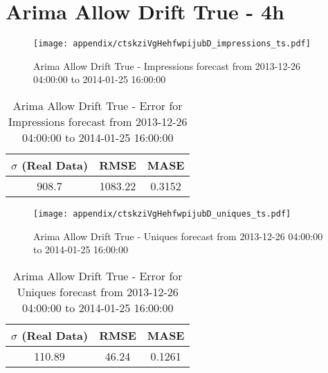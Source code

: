 \section{Arima Allow Drift True - 4h}
\begin{figure}[H] \begin{center} \leavevmode
\texttt{[image: appendix/ctskziVgHehfwpijubD\_impressions\_ts.pdf]} \caption[]{
Arima Allow Drift True - Impressions forecast from 2013-12-26 04:00:00 to 2014-01-25 16:00:00} \label{fig:appendix/ctskziVgHehfwpijubD_impressions_ts.pdf} \end{center}
\end{figure}

\begin{table}[H]
\centering
\footnotesize
\begin{tabular}{ccc}
$\sigma$ (Real Data) & RMSE & MASE   \\ \hline
908.7 & 1083.22 & 0.3152 \\
\end{tabular}

\vspace{0.5cm}

\caption[]{
Arima Allow Drift True - Error for Impressions forecast from 2013-12-26 04:00:00 to 2014-01-25 16:00:00}
\end{table}

\begin{figure}[H] \begin{center} \leavevmode
\texttt{[image: appendix/ctskziVgHehfwpijubD\_uniques\_ts.pdf]} \caption[]{
Arima Allow Drift True - Uniques forecast from 2013-12-26 04:00:00 to 2014-01-25 16:00:00} \label{fig:appendix/ctskziVgHehfwpijubD_uniques_ts.pdf} \end{center}
\end{figure}

\begin{table}[H]
\centering
\footnotesize
\begin{tabular}{ccc}
$\sigma$ (Real Data) & RMSE & MASE   \\ \hline
110.89 & 46.24 & 0.1261 \\
\end{tabular}

\vspace{0.5cm}

\caption[]{
Arima Allow Drift True - Error for Uniques forecast from 2013-12-26 04:00:00 to 2014-01-25 16:00:00}
\end{table}

